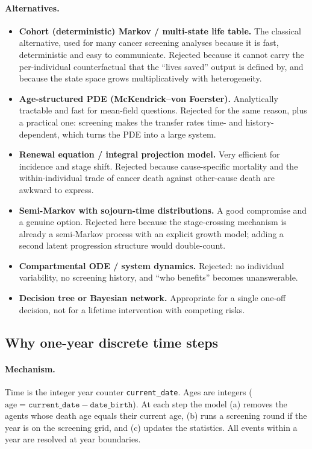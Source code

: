 \documentclass[12pt,a4paper]{article}
\newcommand{\id}[1]{\texttt{#1}}
\newcommand{\mech}[1]{\paragraph{Mechanism.} #1}
\newcommand{\alt}[1]{\paragraph{Alternatives.} #1}
\begin{document}
\alt{\begin{itemize}[nosep]
  \item \textbf{Cohort (deterministic) Markov / multi-state life table.} The classical alternative, used
        for many cancer screening analyses because it is fast, deterministic and easy to communicate.
        Rejected because it cannot carry the per-individual counterfactual that the ``lives saved''
        output is defined by, and because the state space grows multiplicatively with heterogeneity.
  \item \textbf{Age-structured PDE (McKendrick--von Foerster).} Analytically tractable and fast for
        mean-field questions. Rejected for the same reason, plus a practical one: screening makes the
        transfer rates time- and history-dependent, which turns the PDE into a large system.
  \item \textbf{Renewal equation / integral projection model.} Very efficient for incidence and stage
        shift. Rejected because cause-specific mortality and the within-individual trade of cancer death
        against other-cause death are awkward to express.
  \item \textbf{Semi-Markov with sojourn-time distributions.} A good compromise and a genuine option.
        Rejected here because the stage-crossing mechanism is already a semi-Markov process with an
        explicit growth model; adding a second latent progression structure would double-count.
  \item \textbf{Compartmental ODE / system dynamics.} Rejected: no individual variability, no screening
        history, and ``who benefits'' becomes unanswerable.
  \item \textbf{Decision tree or Bayesian network.} Appropriate for a single one-off decision, not for a
        lifetime intervention with competing risks.
\end{itemize}}

\subsection{Why one-year discrete time steps}

\mech{Time is the integer year counter \id{current\_date}. Ages are integers
($\text{age} = \id{current\_date} - \id{date\_birth}$). At each step the model (a) removes the agents
whose death age equals their current age, (b) runs a screening round if the year is on the screening
grid, and (c) updates the statistics. All events within a year are resolved at year boundaries.}
\end{document}

